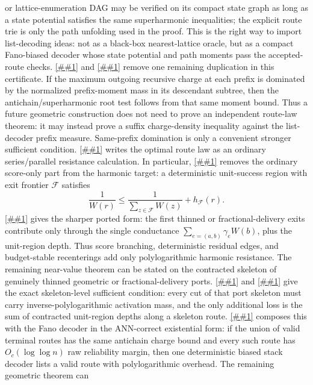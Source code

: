 \documentclass[10pt]{article}
\newcommand{\cref}[1]{\ref{##1}}
\newcommand{\Cref}[1]{\ref{##1}}
\theoremstyle{definition}
\begin{document}
or lattice-enumeration DAG may be verified on its compact state graph as long
as a state potential satisfies the same superharmonic inequalities; the
explicit route trie is only the path unfolding used in the proof.  This is the
right way to import list-decoding ideas: not as a black-box nearest-lattice
oracle, but as a compact Fano-biased decoder whose state potential and path
moments pass the accepted-route checks.
\Cref{lem:moment-dominated-superharmonic} and
\cref{cor:prefix-moment-accepted-route-compiler} remove one remaining
duplication in this certificate.  If the maximum outgoing recursive charge at
each prefix is dominated by the normalized prefix-moment mass in its descendant
subtree, then the antichain/superharmonic root test follows from that same
moment bound.  Thus a future geometric construction does not need to prove an
independent route-law theorem: it may instead prove a suffix charge-density
inequality against the list-decoder prefix measure.  Same-prefix domination is
only a convenient stronger sufficient condition.
\Cref{lem:harmonic-resistance-normal-form} writes the optimal route law as an
ordinary series/parallel resistance calculation.  In particular,
\cref{lem:unit-success-skeleton-contraction} removes the ordinary score-only
part from the harmonic target: a deterministic unit-success region with exit
frontier \(\mathcal F\) satisfies
\[
   \frac1{W(r)}
   \le
   \frac1{\sum_{z\in\mathcal F}W(z)}
   +h_{\mathcal F}(r).
\]
\Cref{lem:ported-unit-region-contraction} gives the sharper ported form: the
first thinned or fractional-delivery exits contribute only through the single
conductance \(\sum_{e=(a,b)}\gamma_eW(b)\), plus the unit-region depth.  Thus
score branching, deterministic residual edges, and budget-stable recenterings
add only polylogarithmic harmonic resistance.  The remaining near-value theorem
can be stated on the contracted skeleton of genuinely thinned geometric or
fractional-delivery ports.  \Cref{lem:port-skeleton-saturated-comparison} and
\cref{cor:skeleton-cut-conductance} give the exact skeleton-level sufficient
condition: every cut of that port skeleton must carry inverse-polylogarithmic
activation mass, and the only additional loss is the sum of contracted
unit-region depths along a skeleton route.
\Cref{cor:existential-antichain-fano} composes this with the Fano decoder in
the ANN-correct existential form: if the union of valid terminal routes has the
same antichain charge bound and every such route has \(O_c(\log\log n)\) raw
reliability margin, then one deterministic biased stack decoder lists a valid
route with polylogarithmic overhead.  The remaining geometric theorem can
\end{document}
